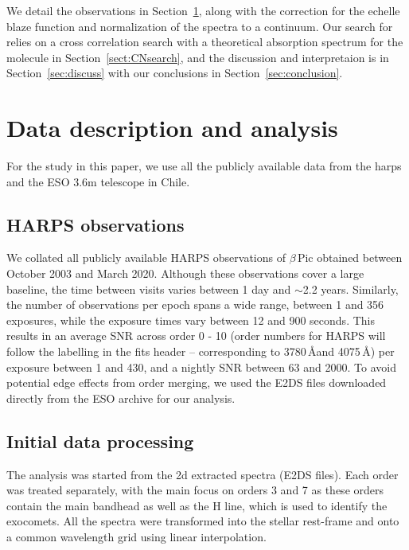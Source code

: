 \documentclass{aa}
\newcommand{\bp}{$\beta$\,Pic}
\begin{document}
We detail the observations in Section~\ref{sec:data}, along with the correction for the echelle blaze function and normalization of the spectra to a continuum.
%
Our search for  relies on a cross correlation search with a theoretical absorption spectrum for the molecule in Section~\ref{sect:CNsearch}, and the discussion and interpretaion is in Section~\ref{sec:discuss} with our conclusions in Section~\ref{sec:conclusion}.

\section{Data description and analysis}\label{sec:data}

For the study in this paper, we use all the publicly available data from the \ac{harps} and the ESO 3.6m telescope in Chile.

\subsection{HARPS observations}

We collated all publicly available HARPS observations of \bp{} obtained between October 2003 and March 2020.
%
Although these observations cover a large baseline, the time between visits varies between 1 day and $\sim$2.2 years.
%
Similarly, the number of observations per epoch spans a wide range, between 1 and 356 exposures, while the exposure times vary between 12 and 900 seconds.
%
This results in an average SNR across order 0 - 10 (order numbers for HARPS will follow the labelling in the fits header -- corresponding to 3780\,\AA and 4075\,\AA) per exposure between 1 and 430, and a nightly SNR between 63 and 2000.
%
To avoid potential edge effects from order merging,  we used the E2DS files downloaded directly from the ESO archive for our analysis.

\subsection{Initial data processing}
The analysis was started from the 2d extracted spectra (E2DS files).
%
Each order was treated separately, with the main focus on orders 3 and 7 as these orders contain the main  bandhead as well as the  H line, which is used to identify the exocomets.
%
All the spectra were transformed into the stellar rest-frame and onto a common wavelength grid using linear interpolation. %
\end{document}
